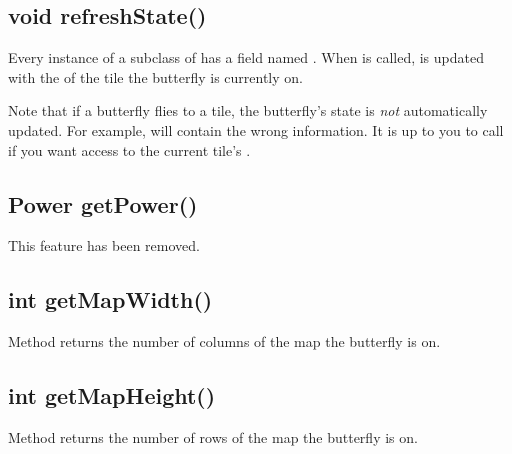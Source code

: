 \documentclass{pset}
\newcommand{\removed}{This feature has been removed.}
\begin{document}
\ifx \VOIDREFRESHSTATE \undefined \else
\subsection{void refreshState()}
Every instance of a subclass of  has a 
field named . When  is called,  is
updated with the  of the tile the butterfly is currently on.

Note that if a butterfly flies to a tile, the butterfly's state is \emph{not}
automatically updated. For example,  will contain the
wrong information. It is up to you to call  if you want
access to the current tile's .  
\fi

\ifx \POWERGETPOWER \undefined \else
\subsection{Power getPower()}
\removed{}
\fi

\ifx \INTGETMAPWIDTH \undefined \else
\subsection{int getMapWidth()}
Method  returns the number of columns of the map the
butterfly is on.
\fi

\ifx \INTGETMAPHEIGHT \undefined \else
\subsection{int getMapHeight()}
Method  returns the number of rows of the map the butterfly
is on.
\fi
\fi

\ifx \LEARNINGRUNNING \undefined \else
\end{document}
